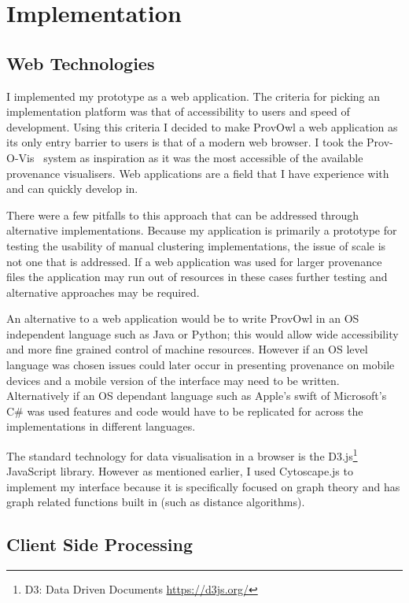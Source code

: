 \section{Implementation}

\subsection{Web Technologies}
\label{sec:web_technologies}

I implemented my prototype as a web application. The criteria for picking an implementation platform was that of accessibility to users and speed of development. Using this criteria I decided to make ProvOwl a web application as its only entry barrier to users is that of a modern web browser. I took the Prov-O-Vis~\cite{Hoekstra2014} system as inspiration as it was the most accessible of the available provenance visualisers. Web applications are a field that I have experience with and can quickly develop in. 

There were a few pitfalls to this approach that can be addressed through alternative implementations. Because my application is primarily a prototype for testing the usability of manual clustering implementations, the issue of scale is not one that is addressed. If a web application was used for larger provenance files the application may run out of resources in these cases further testing and alternative approaches may be required.

An alternative to a web application would be to write ProvOwl in an OS independent language such as Java or Python; this would allow wide accessibility and more fine grained control of machine resources. However if an OS level language was chosen issues could later occur in presenting provenance on mobile devices and a mobile version of the interface may need to be written. Alternatively if an OS dependant language such as Apple's swift of Microsoft's C\# was used features and code would have to be replicated for across the implementations in different languages.

The standard technology for data visualisation in a browser is the D3.js\footnote{D3: Data Driven Documents \url{https://d3js.org/}} JavaScript library. However as mentioned earlier, I used Cytoscape.js to implement my interface because it is specifically focused on graph theory and has graph related functions built in (such as distance algorithms). 

\subsection{Client Side Processing}
\label{sec:client_side_processing}

